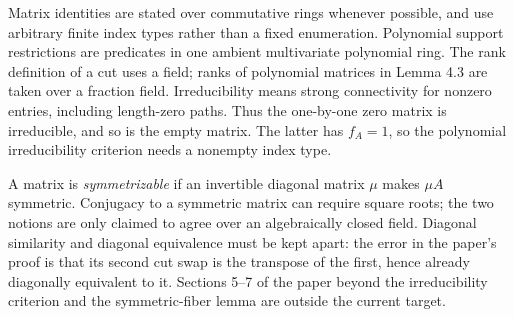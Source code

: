 Matrix identities are stated over commutative rings whenever possible, and use arbitrary
finite index types rather than a fixed enumeration. Polynomial support restrictions are
predicates in one ambient multivariate polynomial ring. The rank definition of a cut
uses a field; ranks of polynomial matrices in Lemma 4.3 are taken over a fraction field.
Irreducibility means strong connectivity for nonzero entries, including length-zero paths.
Thus the one-by-one zero matrix is irreducible, and so is the empty matrix. The latter has
$f_A=1$, so the polynomial irreducibility criterion needs a nonempty index type.

A matrix is \emph{symmetrizable} if an invertible diagonal matrix $\mu$ makes $\mu A$
symmetric. Conjugacy to a symmetric matrix can require square roots; the two notions are
only claimed to agree over an algebraically closed field. Diagonal similarity and
diagonal equivalence must be kept apart: the error in the paper's proof is that its second
cut swap is the transpose of the first, hence already diagonally equivalent to it.
Sections 5--7 of the paper beyond the irreducibility criterion and the symmetric-fiber
lemma are outside the current target.
